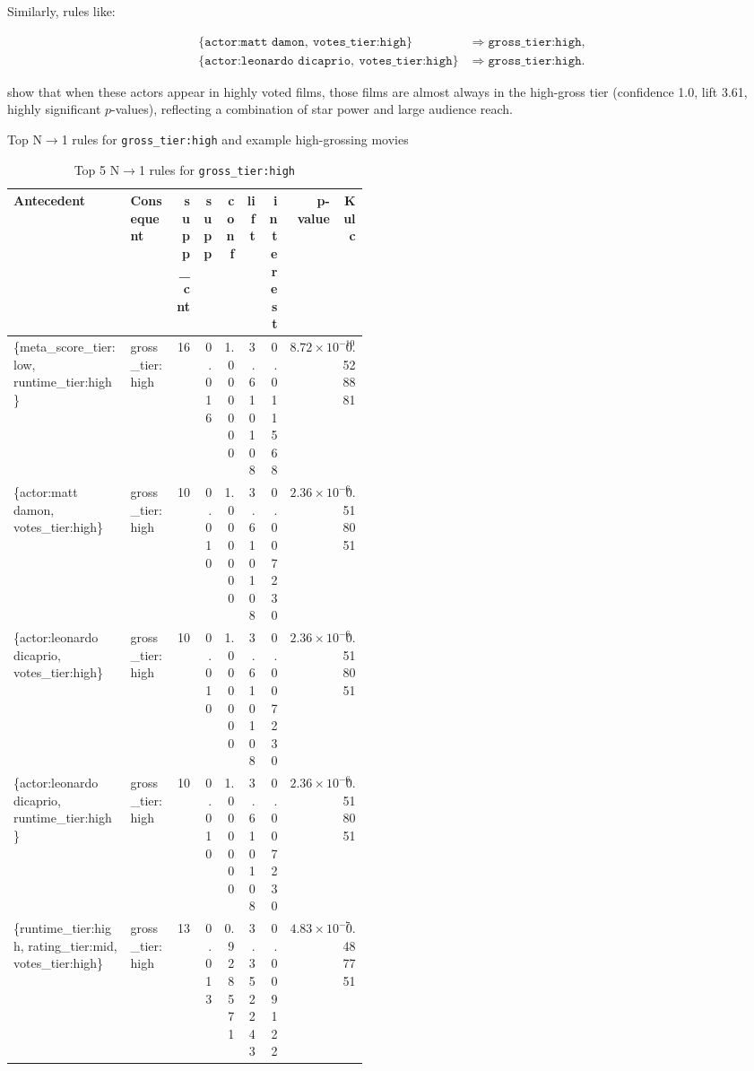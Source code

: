 \documentclass{article}  %
\begin{document}
Similarly, rules like:

\[
\begin{aligned}
\{\texttt{actor:matt damon},\ \texttt{votes\_tier:high}\} &\Rightarrow \texttt{gross\_tier:high},\\
\{\texttt{actor:leonardo dicaprio},\ \texttt{votes\_tier:high}\} &\Rightarrow \texttt{gross\_tier:high}.
\end{aligned}
\]

show that when these actors appear in highly voted films, those films are almost always in the high-gross tier (confidence 1.0, lift 3.61, highly significant \(p\)-values), reflecting a combination of star power and large audience reach.

\begin{table}[!htbp]
    \caption{Top N$\rightarrow$1 rules for \texttt{gross\_tier:high} and example high-grossing movies}
    \centering
    \normalsize
    \setlength{\tabcolsep}{3pt}
    \renewcommand{\arraystretch}{1.1}

    \begin{subtable}{\linewidth}
        \centering
        \caption{Top 5 N$\rightarrow$1 rules for \texttt{gross\_tier:high}}
        \begin{adjustbox}{max width=\linewidth}
        \begin{tabular}{p{0.33\linewidth} p{0.13\linewidth} r r r r r r r}
            \toprule
            \textbf{Antecedent} & \textbf{Consequent} &
            \textbf{supp\_cnt} & \textbf{supp} &
            \textbf{conf} & \textbf{lift} &
            \textbf{interest} & \textbf{p-value} & \textbf{Kulc} \\
            \midrule
            \{meta\_score\_tier:low, runtime\_tier:high\} &
            gross\_tier:high &
            16 & 0.016 & 1.000000 & 3.610108 &
            0.011568 & \(8.72\times 10^{-10}\) & 0.528881 \\
            \{actor:matt damon, votes\_tier:high\} &
            gross\_tier:high &
            10 & 0.010 & 1.000000 & 3.610108 &
            0.007230 & \(2.36\times 10^{-6}\) & 0.518051 \\
            \{actor:leonardo dicaprio, votes\_tier:high\} &
            gross\_tier:high &
            10 & 0.010 & 1.000000 & 3.610108 &
            0.007230 & \(2.36\times 10^{-6}\) & 0.518051 \\
            \{actor:leonardo dicaprio, runtime\_tier:high\} &
            gross\_tier:high &
            10 & 0.010 & 1.000000 & 3.610108 &
            0.007230 & \(2.36\times 10^{-6}\) & 0.518051 \\
            \{runtime\_tier:high, rating\_tier:mid, votes\_tier:high\} &
            gross\_tier:high &
            13 & 0.013 & 0.928571 & 3.352243 &
            0.009122 & \(4.83\times 10^{-7}\) & 0.487751 \\
            \bottomrule
        \end{tabular}
        \end{adjustbox}
    \end{subtable}


\end{table}
\end{document}
